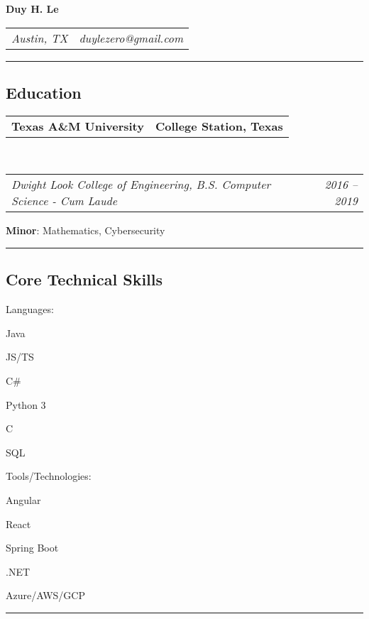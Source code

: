 \documentclass[10pt,letterpaper]{article}
\makeatletter
\newenvironment{indentsection}[1]%
{\begin{list}{}%
	{\setlength{\leftmargin}{#1}}%
	\item[]%
}
{\end{list}}
\newcommand{\headerrow}[2]
{\begin{tabular*}{\linewidth}{l@{\extracolsep{\fill}}r}
	#1 &
	#2 \\
\end{tabular*}}
\newcommand{\CPP}
{C\nolinebreak[4]\hspace{-.05em}\raisebox{.22ex}{\footnotesize\bf ++}}
\makeatother
\begin{document}
\begin{center}
{\LARGE \textbf{Duy H. Le}}
\end{center}
	\headerrow
		{\emph{Austin, TX}}
		{\emph{duylezero@gmail.com}}
\hrule
\vspace{-0.8em}
\subsection*{Education}

	\headerrow
		{\textbf{Texas A\&M University}}
		{\textbf{College Station, Texas}}
	\\
	\headerrow
		{\emph{Dwight Look College of Engineering, B.S. Computer Science - Cum Laude}}
		{\emph{2016 -- 2019}}
	\vspace{-0.4em}
		 \textbf{Minor}: Mathematics, Cybersecurity \\

\hrule
\vspace{-0.8em}
\subsection*{Core Technical Skills}
\vspace{-0.4em}
\begin{indentsection}{\parindent}
\begin{description*}
	\item[Languages:]
	\begin{inparaitem}[\ * \ ]
		 Java
		\item JS/TS
		\item C\#
		\item Python 3
 		\item \CPP \ 
		\item SQL
	\end{inparaitem}
	\item[Tools/Technologies:]
		\begin{inparaitem}[\ * \ ]
 		 Angular
		\item React 
		\item Spring Boot
		\item .NET
		\item Azure/AWS/GCP
	\end{inparaitem}
\end{description*}
\end{indentsection}

\hrule
\vspace{-0.8em}
\end{document}
